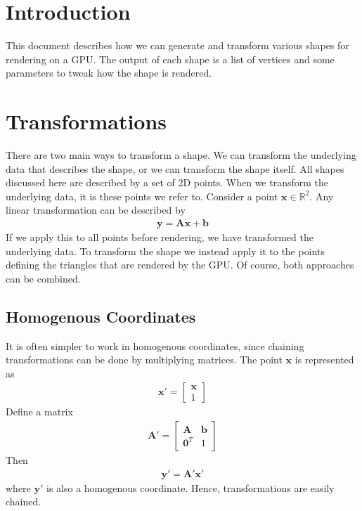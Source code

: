 \documentclass[11pt,a4paper]{article}
\begin{document}
\usetikzlibrary{math}

\section{Introduction}
This document describes how we can generate and transform
various shapes for rendering on a GPU. The output of each
shape is a list of vertices and some parameters to tweak
how the shape is rendered.

\section{Transformations}
There are two main ways to transform a shape. We can transform
the underlying data that describes the shape, or we can transform
the shape itself. All shapes discussed here are described by a set
of 2D points. When we transform the underlying data, it is these
points we refer to. Consider a point $\mathbf{x} \in \mathbb{R}^2$.
Any linear transformation can be described by
%
\begin{align}
  \mathbf{y} = \mathbf{A} \mathbf{x} + \mathbf{b}
\end{align}
%
If we apply this to all points before rendering, we have
transformed the underlying data. To transform the shape
we instead apply it to the points defining the triangles
that are rendered by the GPU. Of course, both approaches
can be combined.

\subsection{Homogenous Coordinates}
It is often simpler to work in homogenous coordinates,
since chaining transformations can be done by multiplying
matrices. The point $\mathbf{x}$ is represented as
%
\begin{align}
  \mathbf{x}' = \begin{bmatrix} \mathbf{x} \\ 1 \end{bmatrix}
\end{align}
%
Define a matrix
%
\begin{align}
  \mathbf{A}' = \begin{bmatrix}
    \mathbf{A} & \mathbf{b} \\
    \mathbf{0}^T & 1
    \end{bmatrix}
\end{align}
%
Then
%
\begin{align}
  \mathbf{y}' = \mathbf{A}' \mathbf{x}'
\end{align}
%
where $\mathbf{y}'$ is also a homogenous coordinate. Hence, transformations
are easily chained.
\end{document}
